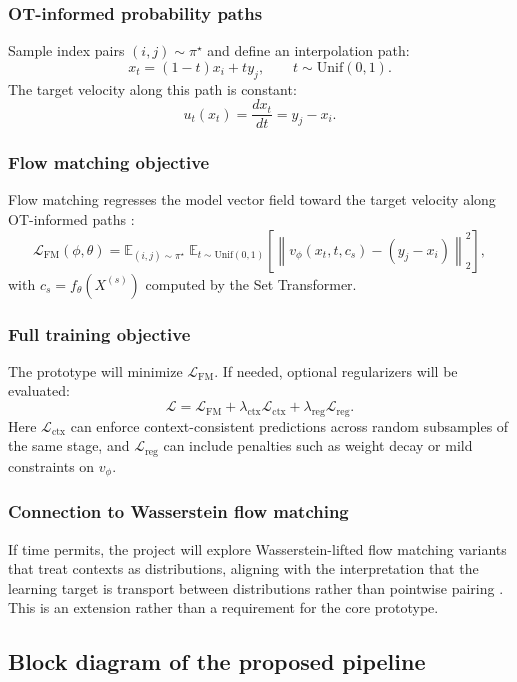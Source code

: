 \documentclass[conference]{IEEEtran}
\newcommand{\E}{\mathbb{E}}
\begin{document}
\subsubsection{OT-informed probability paths}
Sample index pairs $(i,j)\sim \pi^\star$ and define an interpolation path:
\[
x_t = (1-t)x_i + t y_j, \qquad t \sim \mathrm{Unif}(0,1).
\]
The target velocity along this path is constant:
\[
u_t(x_t) = \frac{d x_t}{dt} = y_j - x_i.
\]

\subsubsection{Flow matching objective}
Flow matching regresses the model vector field toward the target velocity along OT-informed paths \cite{Lipman2022-ns}:
\[
\mathcal{L}_{\text{FM}}(\phi,\theta)
=
\E_{(i,j)\sim \pi^\star}\;
\E_{t \sim \mathrm{Unif}(0,1)}
\left[
\left\|
v_{\phi}(x_t, t, c_s)
-
(y_j - x_i)
\right\|_2^2
\right],
\]
with $c_s=f_{\theta}(X^{(s)})$ computed by the Set Transformer.

\subsubsection{Full training objective}
The prototype will minimize $\mathcal{L}_{\text{FM}}$. If needed, optional regularizers will be evaluated:
\[
\mathcal{L}
=
\mathcal{L}_{\text{FM}}
+
\lambda_{\text{ctx}}\mathcal{L}_{\text{ctx}}
+
\lambda_{\text{reg}}\mathcal{L}_{\text{reg}}.
\]
Here $\mathcal{L}_{\text{ctx}}$ can enforce context-consistent predictions across random subsamples of the same stage, and $\mathcal{L}_{\text{reg}}$ can include penalties such as weight decay or mild constraints on $v_{\phi}$.

\subsubsection{Connection to Wasserstein flow matching}
If time permits, the project will explore Wasserstein-lifted flow matching variants that treat contexts as distributions, aligning with the interpretation that the learning target is transport between distributions rather than pointwise pairing \cite{Haviv2024-qe,Haviv2025-kd}. This is an extension rather than a requirement for the core prototype.

\subsection{Block diagram of the proposed pipeline}
\end{document}
